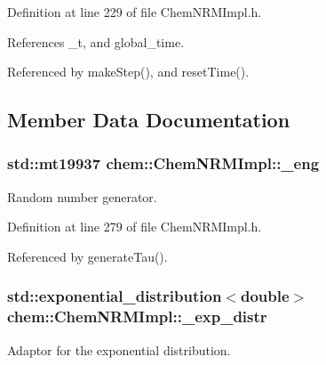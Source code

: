 Definition at line 229 of file Chem\-N\-R\-M\-Impl.\-h.



References \-\_\-t, and global\-\_\-time.



Referenced by make\-Step(), and reset\-Time().



\subsection{Member Data Documentation}
\hypertarget{classchem_1_1ChemNRMImpl_ad0dce1073a3c37dd21c6523a81dd18e6}{
\subsubsection[{\-\_\-eng}]{\setlength{\rightskip}{0pt plus 5cm}std\-::mt19937 {\bf chem\-::\-Chem\-N\-R\-M\-Impl\-::\-\_\-eng}}}\label{classchem_1_1ChemNRMImpl_ad0dce1073a3c37dd21c6523a81dd18e6}


Random number generator. 



Definition at line 279 of file Chem\-N\-R\-M\-Impl.\-h.



Referenced by generate\-Tau().

\hypertarget{classchem_1_1ChemNRMImpl_ac817f5c731ea5522ea661a9e6c978d6a}{
\subsubsection[{\-\_\-exp\-\_\-distr}]{\setlength{\rightskip}{0pt plus 5cm}std\-::exponential\-\_\-distribution$<$double$>$ {\bf chem\-::\-Chem\-N\-R\-M\-Impl\-::\-\_\-exp\-\_\-distr}}}\label{classchem_1_1ChemNRMImpl_ac817f5c731ea5522ea661a9e6c978d6a}


Adaptor for the exponential distribution. 



